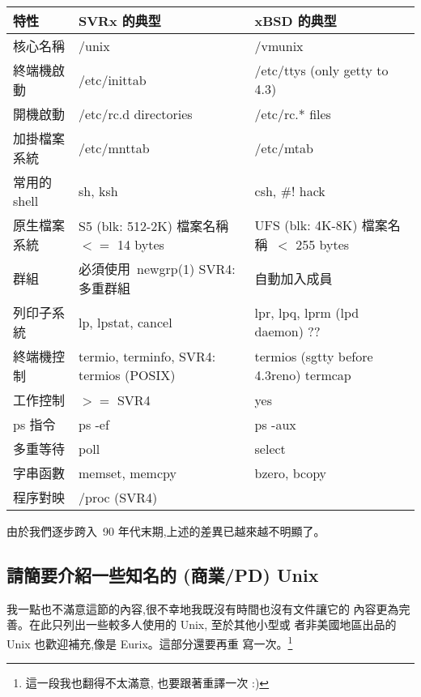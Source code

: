 \documentclass{article}
\begin{document}
\begin{CJK*}{Bg5}{ming}
\footnotesize
\begin{tabular}{|l|p{3.5cm}|p{4cm}|}
\hline
      特性          &   SVRx 的典型           & xBSD 的典型 \\
\hline 
      核心名稱      &   /unix                 & /vmunix \\
      終端機啟動    &   /etc/inittab          & /etc/ttys (only getty to 4.3) \\
      開機啟動      &   /etc/rc.d directories & /etc/rc.* files \\
      加掛檔案系統  &   /etc/mnttab           & /etc/mtab \\
      常用的shell   &   sh, ksh               & csh, \#! hack \\
      原生檔案系統  &   S5 (blk: 512-2K) \newline
                        檔案名稱~$<=$ 14 bytes & UFS (blk: 4K-8K) \newline
						 檔案名稱~$<$ 255 bytes \\
      群組          &   必須使用~newgrp(1) \newline
                        SVR4: 多重群組        & 自動加入成員 \\
      列印子系統    &   lp, lpstat, cancel    & lpr, lpq, lprm (lpd daemon) ?? \\
      終端機控制    &   termio, terminfo, \newline
                        SVR4: termios (POSIX) & termios (sgtty before 4.3reno) \newline
					        termcap \\
      工作控制      &   $>=$ SVR4             & yes \\
      ps 指令       &   ps -ef                & ps -aux \\
      多重等待      &   poll                  & select \\
      字串函數      &   memset, memcpy        & bzero, bcopy \\
      程序對映      &   /proc  (SVR4) & \\
\hline
\end{tabular}
\normalsize

      由於我們逐步跨入~90 年代末期,上述的差異已越來越不明顯了。

\subsection{請簡要介紹一些知名的 (商業/PD) Unix}

      我一點也不滿意這節的內容,很不幸地我既沒有時間也沒有文件讓它的
      內容更為完善。在此只列出一些較多人使用的 Unix, 至於其他小型或
      者非美國地區出品的 Unix 也歡迎補充,像是 Eurix。這部分還要再重
      寫一次。\footnote{這一段我也翻得不太滿意, 也要跟著重譯一次 :)}


\end{CJK*}
\end{document}
